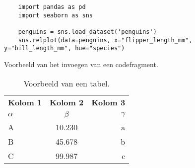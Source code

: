 \begin{listing}
  \begin{verbatim}
    import pandas as pd
    import seaborn as sns

    penguins = sns.load_dataset('penguins')
    sns.relplot(data=penguins, x="flipper_length_mm", y="bill_length_mm", hue="species")
  \end{verbatim}
  \caption[Voorbeeld codefragment]{Voorbeeld van het invoegen van een codefragment.}
\end{listing}


\begin{table}
  \centering
  \begin{tabular}{lcr}
    \toprule
    \textbf{Kolom 1} & \textbf{Kolom 2} & \textbf{Kolom 3} \\
    $\alpha$         & $\beta$          & $\gamma$         \\
    \midrule
    A                & 10.230           & a                \\
    B                & 45.678           & b                \\
    C                & 99.987           & c                \\
    \bottomrule
  \end{tabular}
  \caption[Voorbeeld tabel]{\label{tab:example}Voorbeeld van een tabel.}
\end{table}

